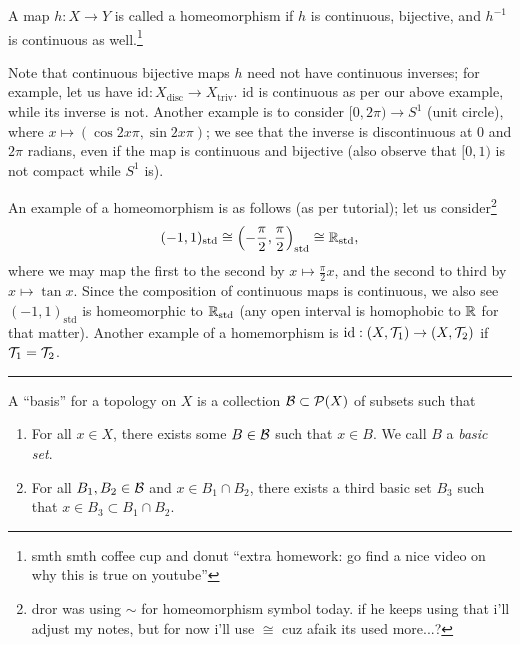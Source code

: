 \begin{definition}[Homeomorphism]
    A map $h : X \to Y$ is called a homeomorphism if $h$ is continuous, bijective, and $h^{-1}$ is continuous as well.\footnote{smth smth coffee cup and donut ``extra homework: go find a nice video on why this is true on youtube''}
\end{definition}
\noindent Note that continuous bijective maps $h$ need not have continuous inverses; for example, let us have $\mathrm{id} : X_\mathrm{disc} \to X_\mathrm{triv}$. $\mathrm{id}$ is continuous as per our above example, while its inverse is not. Another example is to consider $[0, 2\pi) \to S^1$ (unit circle), where $x \mapsto (\cos 2x\pi, \sin 2x\pi)$; we see that the inverse is discontinuous at $0$ and $2\pi$ radians, even if the map is continuous and bijective (also observe that $[0, 1)$ is not compact while $S^1$ is).

\noindent An example of a homeomorphism is as follows (as per tutorial); let us consider\footnote{dror was using $\sim$ for homeomorphism symbol today. if he keeps using that i'll adjust my notes, but for now i'll use $\cong$ cuz afaik its used more...?}
\[ (-1, 1)_\mathrm{std} \cong \left(-\frac{\pi}{2}, \frac{\pi}{2}\right)_\mathrm{std} \cong \mathbb R_\mathrm{std}, \]
where we may map the first to the second by $x \mapsto \frac{\pi}{2}x$, and the second to third by $x \mapsto \tan x$. Since the composition of continuous maps is continuous, we also see $(-1, 1)_\mathrm{std}$ is homeomorphic to $\mathbb R_\mathrm{std}$ (any open interval is homophobic to $\mathbb R$ for that matter).
\medskip\newline
\noindent Another example of a homemorphism is $\mathrm{id} : (X, \mathcal T_1) \to (X, \mathcal T_2)$ if $\mathcal T_1 = \mathcal T_2$.
\bigskip\hrule\bigskip
\noindent A ``basis'' for a topology on $X$ is a collection $\mathcal B \subset \mathcal P(X)$ of subsets such that
\begin{enumerate}
    \item For all $x \in X$, there exists some $B \in \mathcal B$ such that $x \in B$. We call $B$ a \textit{basic set}.
    \item For all $B_1, B_2 \in \mathcal B$ and $x \in B_1 \cap B_2$, there exists a third basic set $B_3$ such that $x \in B_3 \subset B_1 \cap B_2$.
\end{enumerate}

